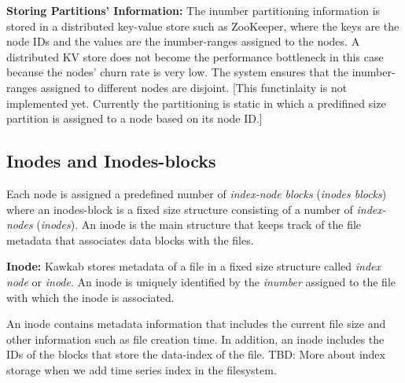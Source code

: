 \documentclass[]{article}
\newcommand{\subtopic}[1]{\vspace{1.5pt} \noindent \textbf{#1}}
\newcommand{\hl}[1]{\textcolor{hlcolor}{#1}}
\begin{document}

\subtopic{Storing Partitions' Information:} The inumber partitioning
information is stored in a distributed key-value store such as ZooKeeper, where
the keys are the node IDs and the values are the inumber-ranges assigned to the
nodes.  A distributed KV store does not become the performance bottleneck in
this case because the nodes' churn rate is very low.  The system ensures that
the inumber-ranges assigned to different nodes are disjoint. [This functinlaity
is not implemented yet. Currently the partitioning is static in which a 
predifined size partition is assigned to a node based on its node ID.]




%

\subsection{Inodes and Inodes-blocks} 

Each node is assigned a predefined number of \textit{index-node blocks}
(\textit{inodes blocks}) where an inodes-block is a fixed size structure
consisting of a number of \textit{index-nodes} (\textit{inodes}).  An inode
is the main structure that keeps track of the file metadata that associates
data blocks with the files.


\subtopic{Inode:} Kawkab stores metadata of a file in a fixed size structure
called \textit{index node} or \textit{inode}. An inode is uniquely identified by
the \textit{inumber} assigned to the file with which the inode is associated.

An inode contains metadata information that includes the current file size 
and other information such as file creation time. In addition, an inode includes
the IDs of the blocks that store the data-index of the file.
\hl{TBD: More about index storage when we add time series index in the
filesystem.}
\end{document}
